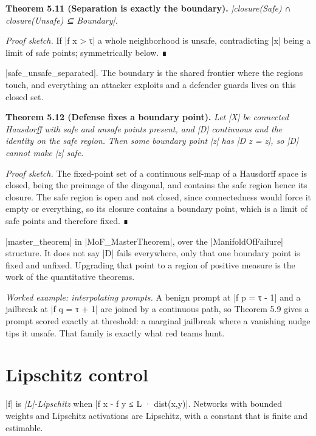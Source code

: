 \documentclass{memoir}
\begin{document}
\textbf{Theorem 5.11 (Separation is exactly the boundary).}
\emph{\LeanVerb|closure(Safe) ∩ closure(Unsafe) ⊆ Boundary|.}

\emph{Proof sketch.} If \LeanVerb|f x > τ| a whole neighborhood is unsafe, contradicting \LeanVerb|x| being a
limit of safe points; symmetrically below. ∎

\LeanVerb|safe_unsafe_separated|. The boundary is the shared frontier where the regions
touch, and everything an attacker exploits and a defender guards lives on this
closed set.

\textbf{Theorem 5.12 (Defense fixes a boundary point).} \emph{Let \LeanVerb|X| be connected Hausdorff with
safe and unsafe points present, and \LeanVerb|D| continuous and the identity on the safe
region. Then some boundary point \LeanVerb|z| has \LeanVerb|D z = z|, so \LeanVerb|D| cannot make \LeanVerb|z|
safe.}

\emph{Proof sketch.} The fixed-point set of a continuous self-map of a Hausdorff space is
closed, being the preimage of the diagonal, and contains the safe region hence
its closure. The safe region is open and not closed, since connectedness would
force it empty or everything, so its closure contains a boundary point, which is
a limit of safe points and therefore fixed. ∎

\LeanVerb|master_theorem| in \LeanVerb|MoF_MasterTheorem|, over the \LeanVerb|ManifoldOfFailure| structure.
It does not say \LeanVerb|D| fails everywhere, only that one boundary point is fixed and
unfixed. Upgrading that point to a region of positive measure is the work of the
quantitative theorems.

\emph{Worked example: interpolating prompts.} A benign prompt at \LeanVerb|f p = τ - 1| and a
jailbreak at \LeanVerb|f q = τ + 1| are joined by a continuous path, so Theorem 5.9 gives
a prompt scored exactly at threshold: a marginal jailbreak where a vanishing
nudge tips it unsafe. That family is exactly what red teams hunt.



\section{Lipschitz control}\label{Two--Schemas--of--Impossibility-005F-005F-005F--Machine--Checked--Limits--of--Trustworthy--Machine--Learning-005F-005F-005F--and--Why--They--Tighten--with--Capability----The--Geometry--of--Attacks----Lipschitz--control}

\LeanVerb|f| is \emph{\LeanVerb|L|-Lipschitz} when \LeanVerb|f x - f y ≤ L · dist(x,y)|. Networks with bounded
weights and Lipschitz activations are Lipschitz, with a constant that is finite
and estimable.
\end{document}
